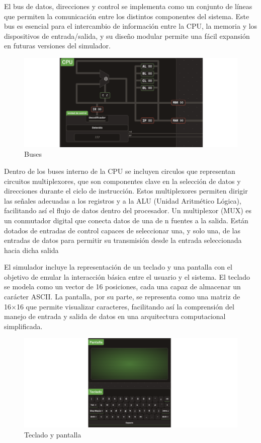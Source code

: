 \documentclass[12pt,oneside]{templates/unerthesis}
\begin{document}
El bus de datos, direcciones y control se implementa como un conjunto de líneas que permiten la comunicación entre los distintos componentes del sistema. Este bus es esencial para el intercambio de información entre la CPU, la memoria y los dispositivos de entrada/salida, y su diseño modular permite una fácil expansión en futuras versiones del simulador.

\begin{figure}

{\centering \includegraphics[width=0.85\linewidth]{images/buses} 

}

\caption{Buses}\label{fig:buses}
\end{figure}

Dentro de los buses interno de la CPU se incluyen circulos que representan circuitos multiplexores, que son componentes clave en la selección de datos y direcciones durante el ciclo de instrucción. Estos multiplexores permiten dirigir las señales adecuadas a los registros y a la ALU (Unidad Aritmético Lógica), facilitando así el flujo de datos dentro del procesador. Un multiplexor (MUX) es un conmutador digital que conecta datos de una de n fuentes a la salida. Están dotados de entradas de control capaces de seleccionar una, y solo una, de las entradas de datos para permitir su transmisión desde la entrada seleccionada hacia dicha salida

El simulador incluye la representación de un teclado y una pantalla con el objetivo de emular la interacción básica entre el usuario y el sistema. El teclado se modela como un vector de 16 posiciones, cada una capaz de almacenar un carácter ASCII. La pantalla, por su parte, se representa como una matriz de 16×16 que permite visualizar caracteres, facilitando así la comprensión del manejo de entrada y salida de datos en una arquitectura computacional simplificada.

\begin{figure}

{\centering \includegraphics[width=0.85\linewidth]{images/tecladopantalla} 

}

\caption{Teclado y pantalla}\label{fig:tecladopantalla}
\end{figure}
\end{document}
